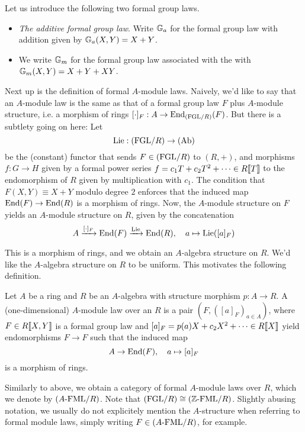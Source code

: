 \documentclass[../main.tex]{subfiles}
\begin{document}
\begin{xpl} Let us introduce the following two formal group laws.
  \begin{itemize}
    \item \textit{The additive formal group law}. Write 
      $\mathbb{G}_a$ for the formal group law with addition given by 
      $\mathbb{G}_a(X,Y) = X + Y$. 
    \item We write $\mathbb{G}_m$ for the formal group law associated with the 
      with $\mathbb{G}_m(X,Y) = X + Y + XY$. 
  \end{itemize}
\end{xpl}

Next up is the definition of formal $A$-module laws. Naively, we'd like to say
that an $A$-module law is the same as that of a formal group law $F$
plus $A$-module structure, i.e. a morphism of rings $[\cdot]_F: A \to
\operatorname{End}_{(\mathrm{FGL}/{R})}(F)$. But there is a subtlety going on here: Let 
\begin{equation*}
  \operatorname{Lie}: {(\mathrm{FGL}/{R})} \to {(\mathrm{Ab})} 
\end{equation*}
be the (constant) functor that sends $F \in {(\mathrm{FGL}/{R})}$ to $(R,+)$, and morphisms
$f: G \to H$ given by a formal power series
$f = c_1 T + c_2 T^2 + \dots \in R\llbracket T \rrbracket$ to the endomorphism
of $R$ given by multiplication with $c_1$. The condition that 
$F(X,Y) \equiv X+Y$ modulo degree $2$ enforces that the induced map
$\operatorname{End}(F) \to \operatorname{End}(R)$ is a morphism of rings. Now, the $A$-module structure on $F$ 
yields an $A$-module structure on $R$, given by the concatenation\begin{equation*}
  A \xrightarrow{[\cdot]_F} \operatorname{End}(F) \xrightarrow{\operatorname{Lie}} \operatorname{End}(R), \quad a \mapsto \operatorname{Lie}([a]_F)
\end{equation*}

This is a morphism of rings, and we obtain an $A$-algebra structure on $R$. We'd
like the $A$-algebra structure on $R$ to be uniform. This
motivates the following definition.
\begin{defi}
  Let $A$ be a ring and $R$ be an $A$-algebra with structure
  morphism $p: A \to R$. A (one-dimensional) $A$-module law over an $R$ is a
  pair $(F, ([a]_F)_{a \in A})$, where $F \in R\llbracket X,Y \rrbracket$ is 
  a formal group law and $[a]_F = p(a)X + c_2X^2 + \dots 
  \in R\llbracket X \rrbracket$ yield endomorphisms $F \to F$ such that the induced map
  \begin{equation*}
    A \to \operatorname{End}(F), \quad a \mapsto [a]_F 
  \end{equation*}
  is a morphism of rings.
\end{defi}
Similarly to above, we obtain a category of formal $A$-module laws over $R$,
which we denote by ${({A}\text-\mathrm{FML}/{R})}$. Note that ${(\mathrm{FGL}/{R})} \cong {({\mathbb{Z}}\text-\mathrm{FML}/{R})}$.
Slightly abusing notation, we usually do not explicitely mention the $A$-structure
when referring to formal module laws, simply writing $F \in {({A}\text-\mathrm{FML}/{R})}$, for
example. 
\end{document}

